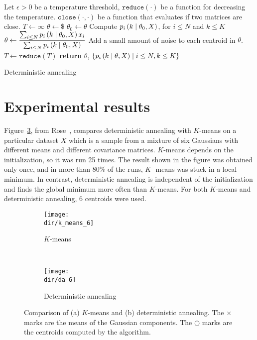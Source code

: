 \begin{algorithm}
\begin{algorithmic}[1]
\State Let
\State \qquad $\epsilon > 0$ be a temperature threshold,
\State \qquad $\texttt{reduce}(\cdot)$ be a function for decreasing the temperature.
\State \qquad $\texttt{close}\left(\cdot, \cdot\right)$ be a function that evaluates if two matrices are close.
\State $T \gets \infty$ 
\State $\theta \gets \$$ 
\Repeat
\State $\theta_0 \gets \theta$
\State Compute $p_{i} \left(k\mid \theta_0, X\right)$, for $i \leq N$ and $k \leq K$
\State $\displaystyle \theta \gets \frac{\sum_{i \leq N} p_{i} \left(k\mid \theta_0, X\right) x_i}{\sum_{i \leq N} p_{i} \left(k\mid \theta_0, X\right)}$
\State Add a small amount of noise to each centroid in $\theta$.
\State $T \gets \texttt{reduce}(T)$
\EndWhile
\State \textbf{return} $\theta$, $\{p_{i} \left(k\mid \theta, X\right) \mid i \leq N, k \leq K\}$
\EndFunction
\end{algorithmic}
\caption{Deterministic annealing}
\label{algo:da_algo_da}
\end{algorithm}

\section{Experimental results}
\label{sec:experiments}

Figure~\ref{fig:da_vs_kmeans}, from Rose~\cite{rose1991deterministic, rose1998deterministic}, compares deterministic annealing with $K$-means
on a particular dataset $X$ which is a sample from a mixture of six Gaussians
with different means and different covariance matrices. $K$-means depends
on the initialization, so it was run 25 times. The result shown in the
figure was obtained only once, and in more than 80\% of the runs, $K$-
means was stuck in a local minimum. In contrast, deterministic annealing
is independent of the initialization and finds the global minimum more
often than $K$-means. For both $K$-means and deterministic annealing, 6
centroids were used.

\begin{figure}
    \centering
    \begin{subfigure}[b]{0.4\textwidth}
        \texttt{[image: \\dir/k\_means\_6]}
        \caption{$K$-means}
        \label{fig:k_means_6}
    \end{subfigure}
    ~ %
    \begin{subfigure}[b]{0.4\textwidth}
        \texttt{[image: \\dir/da\_6]}
        \caption{Deterministic annealing}
        \label{fig:da_6}
    \end{subfigure}
    \caption{Comparison of (a) $K$-means and (b) deterministic annealing. The $\times$ marks are the means of the Gaussian components. The $\bigcirc$ marks are the centroids computed by the algorithm.}
    \label{fig:da_vs_kmeans}
\end{figure}

